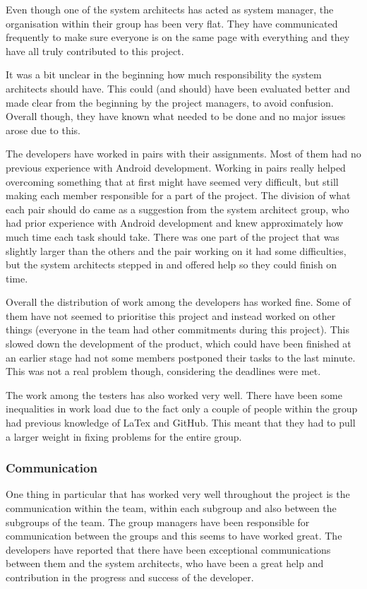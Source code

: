 \documentclass[a4paper]{article}
\begin{document}
Even though one of the system architects has acted as system manager, the organisation within their group has been very flat. They have communicated frequently to make sure everyone is on the same page with everything and they have all truly contributed to this project.

It was a bit unclear in the beginning how much responsibility the system architects should have. This could (and should) have been evaluated better and made clear from the beginning by the project managers, to avoid confusion. Overall though, they have known what needed to be done and no major issues arose due to this.

The developers have worked in pairs with their assignments. Most of them had no previous experience with Android development. Working in pairs really helped overcoming something that at first might have seemed very difficult, but still making each member responsible for a part of the project. The division of what each pair should do came as a suggestion from the system architect group, who had prior experience with Android development and knew approximately how much time each task should take. There was one part of the project that was slightly larger than the others and the pair working on it had some difficulties, but the system architects stepped in and offered help so they could finish on time.

Overall the distribution of work among the developers has worked fine. Some of them have not seemed to prioritise this project and instead worked on other things (everyone in the team had other commitments during this project). This slowed down the development of the product, which could have been finished at an earlier stage had not some members postponed their tasks to the last minute. This was not a real problem though, considering the deadlines were met. 

The work among the testers has also worked very well. There have been some inequalities in work load due to the fact only a couple of people within the group had previous knowledge of LaTex and GitHub. This meant that they had to pull a larger weight in fixing problems for the entire group.




\subsubsection{Communication}
One thing in particular that has worked very well throughout the project is the communication within the team, within each subgroup and also between the subgroups of the team. The group managers have been responsible for communication between the groups and this seems to have worked great. The developers have reported that there have been exceptional communications between them and the system architects, who have been a great help and contribution in the progress and success of the developer. 
\end{document}
